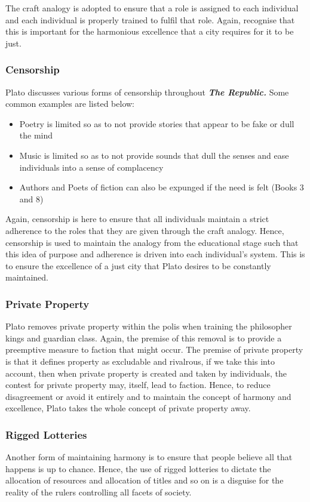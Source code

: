 \documentclass[12pt, letterpaper]{article}
\begin{document}
The craft analogy is adopted to ensure that a role is assigned to each individual and each individual is properly trained to fulfil that role. Again, recognise that this is important for the harmonious excellence that a city requires for it to be just.

\subsubsection{Censorship}
Plato discusses various forms of censorship throughout \textbf{\textit{The Republic.}} Some common examples are listed below:
\begin{itemize}
	\item Poetry is limited so as to not provide stories that appear to be fake or dull the mind
	\item Music is limited so as to not provide sounds that dull the senses and ease individuals into a sense of complacency
	\item Authors and Poets of fiction can also be expunged if the need is felt (Books 3 and 8)
\end{itemize}
Again, censorship is here to ensure that all individuals maintain a strict adherence to the roles that they are given through the craft analogy. Hence, censorship is used to maintain the analogy from the educational stage such that this idea of purpose and adherence is driven into each individual's system. This is to ensure the excellence of a just city that Plato desires to be constantly maintained.

\subsubsection{Private Property}
Plato removes private property within the polis when training the philosopher kings and guardian class. Again, the premise of this removal is to provide a preemptive measure to faction that might occur. The premise of private property is that it defines property as excludable and rivalrous, if we take this into account, then when private property is created and taken by individuals, the contest for private property may, itself, lead to faction. Hence, to reduce disagreement or avoid it entirely and to maintain the concept of harmony and excellence, Plato takes the whole concept of private property away.

\subsubsection{Rigged Lotteries}
Another form of maintaining harmony is to ensure that people believe all that happens is up to chance. Hence, the use of rigged lotteries to dictate the allocation of resources and allocation of titles and so on is a disguise for the reality of the rulers controlling all facets of society.
\end{document}
